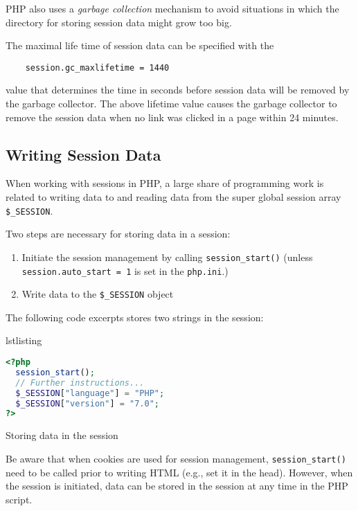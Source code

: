 \documentclass[a4paper, justified, notoc]{tufte-handout} %
\makeatletter
\newenvironment{listing}[1][htbp]
  {\ifvmode\else\unskip\fi\begin{@tufte@float}[#1]{lstlisting}{}}
  {\end{@tufte@float} } %
\makeatother
\begin{document}
PHP also uses a \emph{garbage collection} mechanism to avoid situations in which the directory for storing session data might grow too big. 

The maximal life time of session data can be specified with the 
\begin{Verbatim}
	session.gc_maxlifetime = 1440 
\end{Verbatim}
value that determines the time in seconds before session data will be removed by the garbage collector. 
The above lifetime value causes the garbage collector to remove the session data when no link was clicked in a page within 24 minutes.   

\subsection{Writing Session Data} %
\label{sub:writing_session_data}
 When working with sessions in PHP, a large share of programming work is related to writing data to and reading data from the super global session array \texttt{\$\_SESSION}.

Two steps are necessary for storing data in a session:
\begin{enumerate}
	\item Initiate the session management by calling \texttt{session\_start()} \newline (unless \texttt{session.auto\_start = 1} is set in the \texttt{php.ini}.)
	\item Write data to the \texttt{\$\_SESSION} object
\end{enumerate}

The following code excerpts stores two strings in the session:
\begin{listing}
\begin{lstlisting}[language=PHP]
<?php
  session_start();
  // Further instructions...
  $_SESSION["language"] = "PHP";
  $_SESSION["version"] = "7.0";
?>
\end{lstlisting}
	\caption{Storing data in the session}
	\label{writing_session_data}
\end{listing}

Be aware that when cookies are used for session management, \texttt{session\_start()} need to be called prior to writing HTML (e.g., set it in the head). However, when the session is initiated, data can be stored in the session at any time in the PHP script.
\end{document}
